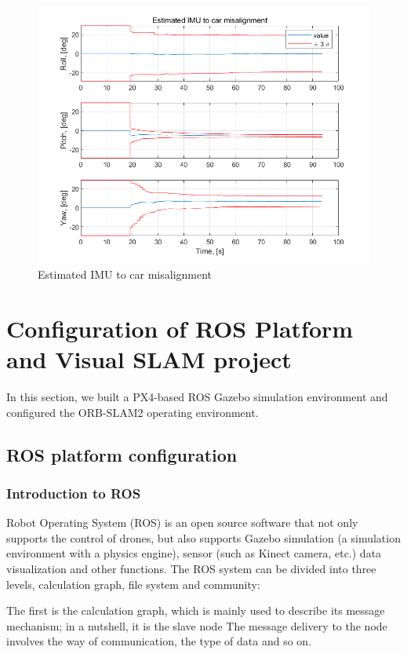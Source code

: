 \documentclass[conference]{IEEEtran}
\begin{document}
\begin{figure}[htbp]
    \centerline{\includegraphics[width=1.0\columnwidth]{fig27.png}}
    \caption{Estimated IMU to car misalignment}
\end{figure}


\section{Configuration of ROS Platform and Visual SLAM project}
In this section, we built a PX4-based ROS Gazebo simulation environment and configured the ORB-SLAM2 operating environment.
\subsection{ROS platform configuration}
\subsubsection{Introduction to ROS}
Robot Operating System (ROS) is an open source software that not only supports the control of drones, but also supports Gazebo simulation (a simulation environment with a physics engine), sensor (such as Kinect camera, etc.) data visualization and other functions.
The ROS system can be divided into three levels, calculation graph, file system and community:

The first is the calculation graph, which is mainly used to describe its message mechanism; in a nutshell, it is the slave node The message delivery to the node involves the way of communication, the type of data and so on.
\end{document}
